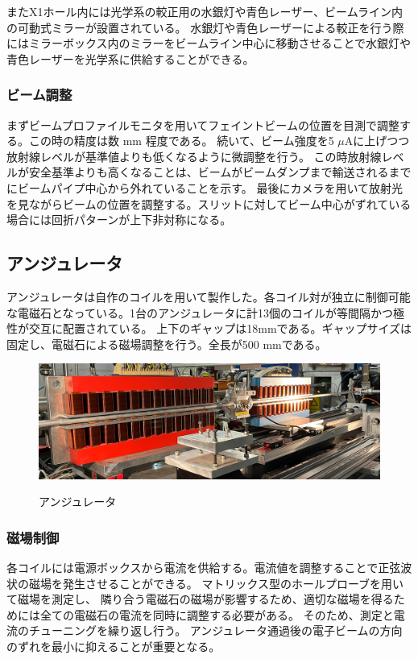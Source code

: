 \documentclass[a4paper,11pt,uplatex]{jsbook}
\begin{document}
またX1ホール内には光学系の較正用の水銀灯や青色レーザー、ビームライン内の可動式ミラーが設置されている。
水銀灯や青色レーザーによる較正を行う際にはミラーボックス内のミラーをビームライン中心に移動させることで水銀灯や青色レーザーを光学系に供給することができる。
\subsubsection{ビーム調整}
まずビームプロファイルモニタを用いてフェイントビームの位置を目測で調整する。この時の精度は数 mm 程度である。
続いて、ビーム強度を5 $\si{\mu}\text{A}$に上げつつ放射線レベルが基準値よりも低くなるように微調整を行う。
この時放射線レベルが安全基準よりも高くなることは、ビームがビームダンプまで輸送されるまでにビームパイプ中心から外れていることを示す。
最後にカメラを用いて放射光を見ながらビームの位置を調整する。スリットに対してビーム中心がずれている場合には回折パターンが上下非対称になる。

\subsection{アンジュレータ}
アンジュレータは自作のコイルを用いて製作した。各コイル対が独立に制御可能な電磁石となっている。1台のアンジュレータに計13個のコイルが等間隔かつ極性が交互に配置されている。
上下のギャップは18mmである。ギャップサイズは固定し、電磁石による磁場調整を行う。全長が500 mmである。
\begin{figure}
  \centering
  \includegraphics[width=0.8\linewidth]{image/3-undulator.png}\\
  \caption{アンジュレータ}
  \label{undulator}
\end{figure}
\subsubsection{磁場制御}
各コイルには電源ボックスから電流を供給する。電流値を調整することで正弦波状の磁場を発生させることができる。
マトリックス型のホールプローブを用いて磁場を測定し、
隣り合う電磁石の磁場が影響するため、適切な磁場を得るためには全ての電磁石の電流を同時に調整する必要がある。
そのため、測定と電流のチューニングを繰り返し行う。
アンジュレータ通過後の電子ビームの方向のずれを最小に抑えることが重要となる。
\end{document}
